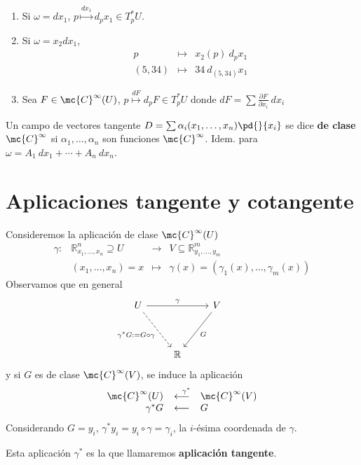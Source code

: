\begin{eje}\:
    \begin{enumerate}
        \item Si $\omega=dx_1$, $p \overset{dx_1}{\longmapsto} d_px_1 \in T^*_pU$.
        \item Si $\omega =x_2 dx_1$, 
        $$\begin{array}{rcl}
             p & \longmapsto & x_2(p) \: d_px_1  \\
             (5,34) & \longmapsto & 34 \: d_{(5,34)}x_1
        \end{array}$$
        \item Sea $F \in \mc{C}^{\infty}(U)$, $p \overset{dF}{\longmapsto} d_pF \in T^*_pU$ donde $dF=\sum \frac{\partial F}{\partial x_i}\: dx_i$
    \end{enumerate}
\end{eje}
\begin{defi}
Un campo de vectores tangente $D=\sum \alpha_i(x_1, \ldots , x_n) \pd{}{x_i}$ se dice \textbf{de clase} $\mc{C}^{\infty}$ si $\alpha_1, \ldots, \alpha_n$ son funciones $\mc{C}^{\infty}$. Idem. para $\omega=A_1 \: dx_1 + \cdots + A_n \: dx_n$. 
\end{defi}
\section{Aplicaciones tangente y cotangente}
\begin{defi} Consideremos la aplicación de clase $\mc{C}^{\infty}(U)$
$$\begin{array}{rrcl}
     \gamma : & \mathbb{R}^n_{x_1, \ldots, x_n} \supseteq U & \longrightarrow & V \subseteq \mathbb{R}^m_{y_1, \ldots, y_m}  \\
     & (x_1, \ldots, x_n)=x & \longmapsto & \gamma(x)=(\gamma_1(x), \ldots, \gamma_m(x)) 
\end{array}$$
Observamos que en general
$$\begin{tikzcd}
    U \arrow[swap,dashed]{ddr}{\gamma^*G:=G\circ \gamma} \arrow{rr}{\gamma} & & V \arrow{ddl}{G} \\
    & & &\\
    & \mathbb{R} & 
\end{tikzcd}$$
y si $G$ es de clase $\mc{C}^{\infty}(V)$, se induce la aplicación
$$\begin{array}{rcl}
     \mc{C}^{\infty}(U) & \overset{\: \: \: \: \: \gamma^*}{\longleftarrow} & \mc{C}^{\infty}(V)   \\
     \gamma^* G & \longleftarrow & G 
\end{array}$$
Considerando $G=y_i$, $\gamma^*y_i=y_i \circ \gamma=\gamma_i$, la $i$-ésima coordenada de $\gamma$.

Esta aplicación $\gamma^*$ es la que llamaremos \textbf{aplicación tangente}.
\end{defi}

